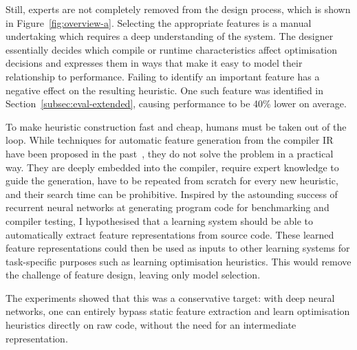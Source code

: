 Still, experts are not completely removed from the design process, which is shown in Figure~\ref{fig:overview-a}. Selecting the appropriate features is a manual undertaking which requires a deep understanding of the system. The designer essentially decides which compile or runtime characteristics affect optimisation decisions and expresses them in ways that make it easy to model their relationship to performance. Failing to identify an important feature has a negative effect on the resulting heuristic. One such feature was identified in Section~\ref{subsec:eval-extended}, causing performance to be 40\% lower on average.

To make heuristic construction fast and cheap, humans must be taken out of the loop. While techniques for automatic feature generation from the compiler IR have been proposed in the past~\cite{Namolaru2010a,Leather2014}, they do not solve the problem in a practical way. They are deeply embedded into the compiler, require expert knowledge to guide the generation, have to be repeated from scratch for every new heuristic, and their search time can be prohibitive. Inspired by the astounding success of recurrent neural networks at generating program code for benchmarking and compiler testing, I hypothesised that a learning system should be able to automatically extract feature representations from source code. These learned feature representations could then be used as inputs to other learning systems for task-specific purposes such as learning optimisation heuristics. This would remove the challenge of feature design, leaving only model selection.

The experiments showed that this was a conservative target: with deep neural networks, one can entirely bypass static feature extraction and learn optimisation heuristics directly on raw code, without the need for an intermediate representation.

